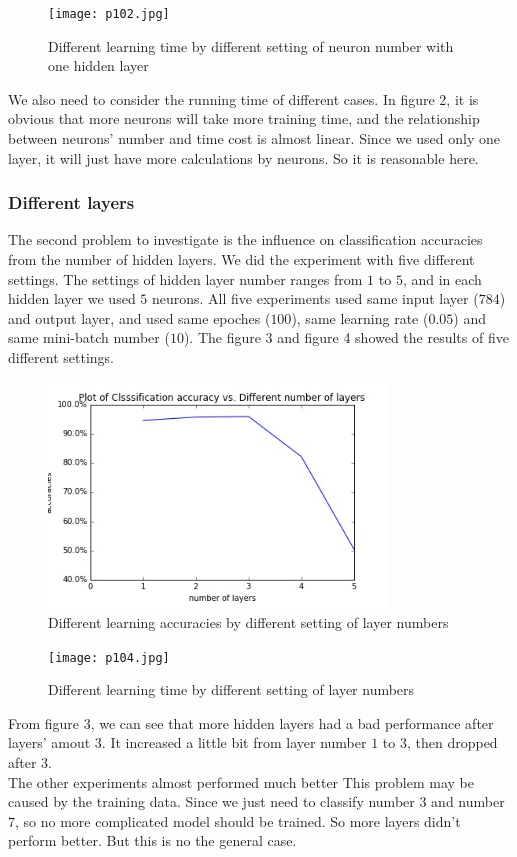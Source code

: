 \documentclass[12pt,a4paper]{article}
\begin{document}
\begin{figure}
\centering
\texttt{[image: p102.jpg]}\\
\caption{Different learning time by different setting of neuron number with one hidden layer}
\end{figure}

We also need to consider the running time of different cases. In figure 2, it is obvious that more neurons will take more training time, and the relationship between neurons' number and time cost is almost linear. Since we used only one layer, it will just have more calculations by neurons. So it is reasonable here.\\
\subsubsection{Different layers}
The second problem to investigate is the influence on classification accuracies from the number of hidden layers. We did the experiment with five different settings. The settings of hidden layer number ranges from $1$ to $5$, and in each hidden layer we used $5$ neurons. All five experiments used same input layer ($784$) and output layer, and used same epoches ($100$), same learning rate ($0.05$) and same mini-batch number ($10$). The figure 3 and figure 4 showed the results of five different settings.\\
\begin{figure}
\centering
\includegraphics[width=90mm,scale=1]{p103.jpg}
\caption{Different learning accuracies by different setting of layer numbers}
\end{figure}

\begin{figure}
\centering
\texttt{[image: p104.jpg]}
\caption{Different learning time by different setting of layer numbers}
\end{figure}

From figure 3, we can see that more hidden layers had a bad performance after layers' amout $3$. It increased a little bit from layer number $1$ to $3$, then dropped after $3$.\\
The other experiments almost performed much better This problem may be caused by the training data. Since we just need to classify number $3$ and number $7$, so no more complicated model should be trained. So more layers didn't perform better. But this is no the general case.\\
\end{document}
